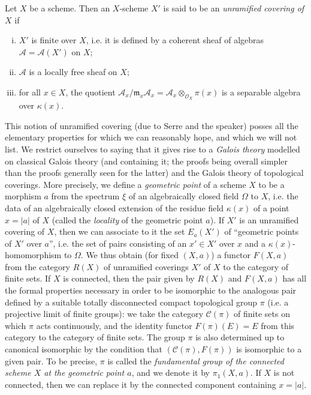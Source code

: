 \documentclass{article}
\theoremstyle{plain}
\theoremstyle{definition}
\newcommand{\sh}{\mathscr}
\newcommand{\cat}{\mathcal}
\newcommand{\fk}{\mathfrak}
\newcommand{\kres}{\kappa}
\newcommand{\oldpage}[1]{\marginpar{\footnotesize$\Big\vert$ \textit{p.~#1}}}
\begin{document}
Let $X$ be a scheme.
Then an $X$-scheme $X'$ is said to be an \emph{unramified covering of $X$}
\oldpage{182-18}
if
\begin{enumerate}[i.]
  \item $X'$ is finite over $X$, i.e. it is defined by a coherent sheaf of algebras $\sh{A}=\sh{A}(X')$ on $X$;
  \item $\sh{A}$ is a locally free sheaf on $X$;
  \item for all $x\in X$, the quotient $\sh{A}_x/\fk{m}_x\sh{A}_x = \sh{A}_x\otimes_{\sh{O}_X}\pi(x)$ is a separable algebra over $\kres(x)$.
\end{enumerate}

This notion of unramified covering (due to Serre and the speaker) posses all the elementary properties for which we can reasonably hope, and which we will not list.
We restrict ourselves to saying that it gives rise to a \emph{Galois theory} modelled on classical Galois theory (and containing it; the proofs being overall simpler than the proofs generally seen for the latter) and the Galois theory of topological coverings.
More precisely, we define a \emph{geometric point} of a scheme $X$ to be a morphism $a$ from the spectrum $\xi$ of an algebraically closed field $\Omega$ to $X$, i.e. the data of an algebraically closed extension of the residue field $\kres(x)$ of a point $x=|a|$ of $X$ (called the \emph{locality} of the geometric point $a$).
If $X'$ is an unramified covering of $X$, then we can associate to it the set $E_a(X')$ of ``geometric points of $X'$ over $a$'', i.e. the set of pairs consisting of an $x'\in X'$ over $x$ and a $\kres(x)$-homomorphism to $\Omega$.
We thus obtain (for fixed $(X,a)$) a functor $F(X,a)$ from the category $R(X)$ of unramified coverings $X'$ of $X$ to the category of finite sets.
If $X$ is connected, then the pair given by $R(X)$ and $F(X,a)$ has all the formal properties necessary in order to be isomorphic to the analogous pair defined by a suitable totally disconnected compact topological group $\pi$ (i.e. a projective limit of finite groups): we take the category $\cat{C}(\pi)$ of finite sets on which $\pi$ acts continuously, and the identity functor $F(\pi)(E)=E$ from this category to the category of finite sets.
The group $\pi$ is also determined up to canonical isomorphic by the condition that $(\cat{C}(\pi),F(\pi))$ is isomorphic to a given pair.
To be precise, $\pi$ is called the \emph{fundamental group of the connected scheme $X$ at the geometric point $a$}, and we denote it by $\pi_1(X,a)$.
If $X$ is not connected, then we can replace it by the connected component containing $x=|a|$.
\end{document}
